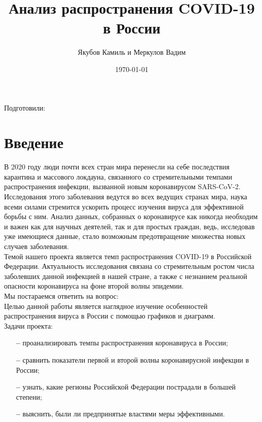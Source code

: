 \documentclass[a4paper, 12pt]{extarticle}
\title{Анализ распространения COVID-19 в России}
\author{Якубов Камиль и Меркулов Вадим}
\date{\today}
\begin{document}
\begin{titlepage}
    \vspace*{5cm}
    \begin{center}

        \huge{\textbf{\thetitle}}

        \vspace{2 cm}
        \large
        Подготовили:\\
        \Large{\theauthor}
        \vfill
        \large
        \thedate

    \end{center}
\end{titlepage}

\tableofcontents
\newpage

\section{Введение}

В 2020 году люди почти всех стран мира перенесли на себе последствия карантина
и массового локдауна, связанного со стремительными темпами распространения
инфекции, вызванной новым коронавирусом SARS-CoV-2. Исследования этого
заболевания ведутся во всех ведущих странах мира, наука всеми силами стремится
ускорить процесс изучения вируса для эффективной борьбы с ним. Анализ данных,
собранных о коронавирусе как никогда необходим и важен как для научных
деятелей, так и для простых граждан, ведь, исследовав уже имеющиеся данные,
стало возможным предотвращение множества новых случаев заболевания.
\\

Темой нашего проекта является темп распространения COVID-19 в Российской
Федерации. Актуальность исследования связана со стремительным ростом числа
заболевших данной инфекцией в нашей стране, а также с незнанием реальной
опасности коронавируса на фоне второй волны эпидемии.
\\

Мы постараемся ответить на вопрос: 
\\

Целью данной работы является наглядное изучение особенностей распространения
вируса в России с помощью графиков и диаграмм.
\\

Задачи проекта:
\begin{itemize}
    \item[\bfseries--] проанализировать темпы распространения коронавируса в России;
    \item[\bfseries--] сравнить показатели первой и второй волны коронавирусной инфекции в России;
    \item[\bfseries--] узнать, какие регионы Российской Федерации пострадали в большей степени;
    \item[\bfseries--] выяснить, были ли предпринятые властями меры эффективными.
\end{itemize}
\end{document}
